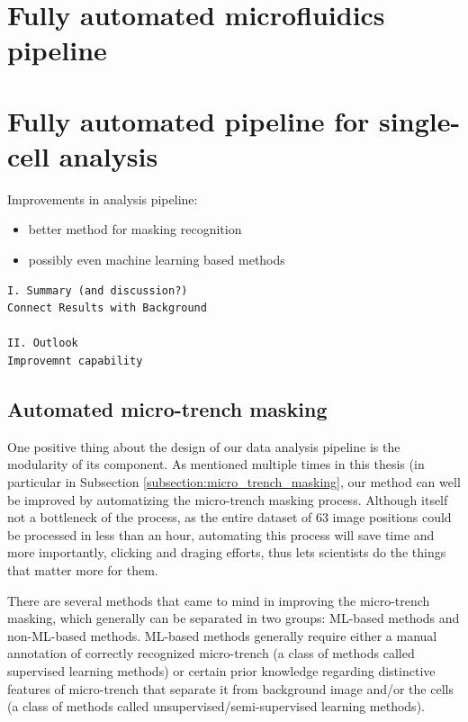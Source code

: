 \documentclass[pdftex,12pt,a4paper]{report}
\begin{document}

\section{Fully automated microfluidics pipeline}

\section{Fully automated pipeline for single-cell analysis}


Improvements in analysis pipeline:

\begin{itemize}
\item better method for masking recognition
\item possibly even machine learning based methods
\end{itemize}

\begin{verbatim}
I. Summary (and discussion?)
Connect Results with Background

II. Outlook
Improvemnt capability
\end{verbatim}

\subsection{Automated micro-trench masking}

One positive thing about the design of our data analysis pipeline is the modularity of its component. As mentioned multiple times in this thesis (in particular in Subsection \ref{subsection:micro_trench_masking}, our method can well be improved by automatizing the micro-trench masking process. Although itself not a bottleneck of the process, as the entire dataset of 63 image positions could be processed in less than an hour, automating this process will save time and more importantly, clicking and draging efforts, thus lets scientists do the things that matter more for them.

There are several methods that came to mind in improving the micro-trench masking, which generally can be separated in two groups: ML-based methods and non-ML-based methods. ML-based methods generally require either a manual annotation of correctly recognized micro-trench (a class of methods called supervised learning methods) or certain prior knowledge regarding distinctive features of micro-trench that separate it from background image and/or the cells (a class of methods called unsupervised/semi-supervised learning methods).
\end{document}
